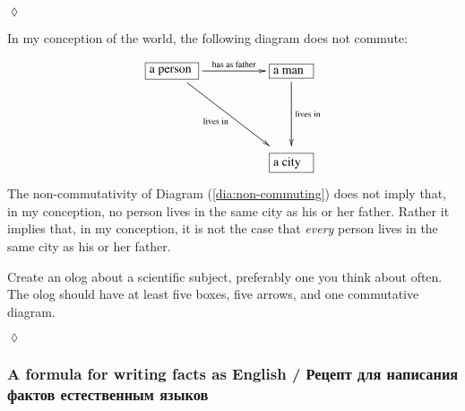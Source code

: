 \documentclass{book}
\def\tn{\textnormal}
\newcommand{\LA}[2]{\ar[#1]^-{\tn {#2}}}
\newcommand{\LAL}[2]{\ar[#1]_-{\tn {#2}}}
\newcommand{\obox}[3]{\stackrel{#1}{\fbox{\parbox{#2}{#3}}}}
\theoremstyle{theoremENG}
\theoremstyle{lemmaENG}
\theoremstyle{propositionENG}
\theoremstyle{corollaryENG}
\theoremstyle{factENG}
\theoremstyle{remarkENG}
\theoremstyle{exampleENG}
\newtheorem{exampleENG}[subsubsection]{\begin{english}Example\end{english}}
\theoremstyle{warningENG}
\theoremstyle{questionENG}
\theoremstyle{guessENG}
\theoremstyle{answerENG}
\theoremstyle{constructionENG}
\theoremstyle{rulesENG}
\theoremstyle{excENG}
\newtheorem{excENG}[subsubsection]{\begin{english}Exercise\end{english}}
\theoremstyle{appENG}
\theoremstyle{definitionENG}
\theoremstyle{notationENG}
\theoremstyle{conjectureENG}
\theoremstyle{postulateENG}
\newenvironment{exerciseENG}{\begin{excENG}}{\hspace*{\fill}$\lozenge$\end{excENG}}
\theoremstyle{theoremRUS}
\theoremstyle{lemmaRUS}
\theoremstyle{propositionRUS}
\theoremstyle{corollaryRUS}
\theoremstyle{factRUS}
\theoremstyle{remarkRUS}
\theoremstyle{exampleRUS}
\theoremstyle{warningRUS}
\theoremstyle{questionRUS}
\theoremstyle{guessRUS}
\theoremstyle{answerRUS}
\theoremstyle{constructionRUS}
\theoremstyle{rulesRUS}
\theoremstyle{excRUS}
\theoremstyle{appRUS}
\theoremstyle{definitionRUS}
\theoremstyle{notationRUS}
\theoremstyle{conjectureRUS}
\theoremstyle{postulateRUS}
\begin{document}
\begin{english}
\begin{exerciseENG}
\begin{russian} \end{russian}

\end{exerciseENG}

\begin{exampleENG}

In my conception of the world, the following diagram does not commute:
\begin{align}\label{dia:non-commuting}
\xymatrixnocompile@=50pt{\obox{}{.5in}{a person}\LA{r}{has as father}\LAL{dr}{lives in}&\obox{}{.4in}{a man}\LA{d}{lives in}\\&\obox{}{.4in}{a city}}
\end{align}
The non-commutativity of Diagram (\ref{dia:non-commuting}) does not imply that, in my conception, no person lives in the same city as his or her father. Rather it implies that, in my conception, it is not the case that {\em every} person lives in the same city as his or her father.

\begin{russian} \end{russian}

\end{exampleENG}

\begin{exerciseENG}

Create an olog about a scientific subject, preferably one you think about often. The olog should have at least five boxes, five arrows, and one commutative diagram. 

\begin{russian} \end{russian}

\end{exerciseENG}


\subsubsection{A formula for writing facts as English / Рецепт для написания фактов естественным языков}


\end{english}
\end{document}
